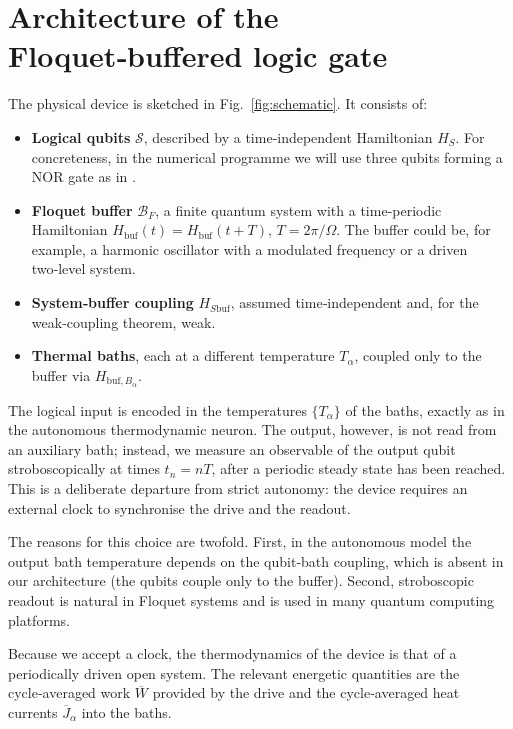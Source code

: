 \documentclass[11pt,a4paper]{article}
\theoremstyle{plain}
\theoremstyle{definition}
\theoremstyle{remark}
\newcommand{\calS}{\mathcal{S}}
\newcommand{\calB}{\mathcal{B}}
\begin{document}
\section{Architecture of the Floquet‑buffered logic gate}\label{sec:architecture}
The physical device is sketched in Fig.~\ref{fig:schematic}. It consists of:
\begin{itemize}
    \item \textbf{Logical qubits} $\calS$, described by a time‑independent Hamiltonian $H_S$. For concreteness, in the numerical programme we will use three qubits forming a NOR gate as in \cite{LipkaBartosik2024}.
    \item \textbf{Floquet buffer} $\calB_F$, a finite quantum system with a time‑periodic Hamiltonian $H_{\text{buf}}(t)=H_{\text{buf}}(t+T)$, $T=2\pi/\Omega$. The buffer could be, for example, a harmonic oscillator with a modulated frequency or a driven two‑level system.
    \item \textbf{System‑buffer coupling} $H_{S\text{buf}}$, assumed time‑independent and, for the weak‑coupling theorem, weak.
    \item \textbf{Thermal baths}, each at a different temperature $T_\alpha$, coupled only to the buffer via $H_{\text{buf},B_\alpha}$.
\end{itemize}

The logical input is encoded in the temperatures $\{T_\alpha\}$ of the baths, exactly as in the autonomous thermodynamic neuron. The output, however, is not read from an auxiliary bath; instead, we measure an observable of the output qubit stroboscopically at times $t_n=nT$, after a periodic steady state has been reached. This is a deliberate departure from strict autonomy: the device requires an external clock to synchronise the drive and the readout.

The reasons for this choice are twofold. First, in the autonomous model the output bath temperature depends on the qubit‑bath coupling, which is absent in our architecture (the qubits couple only to the buffer). Second, stroboscopic readout is natural in Floquet systems and is used in many quantum computing platforms.

Because we accept a clock, the thermodynamics of the device is that of a periodically driven open system. The relevant energetic quantities are the cycle‑averaged work $\overline{W}$ provided by the drive and the cycle‑averaged heat currents $\overline{J}_\alpha$ into the baths.
\end{document}
